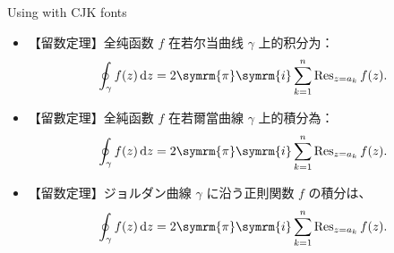\documentclass[aspectratio=169]{beamer}
\def\ii{\symrm{i}}
\def\pp{\symrm{\pi}}
\begin{document}
\begin{frame}{Using with CJK fonts}
\begin{itemize}
  \item {\fontzhhans 【留数定理】全纯函数 $f$ 在若尔当曲线 $\gamma$ 上的积分为：}
    \[
      \oint_\gamma f(z) \dd{z}
      = 2\pp\ii \sum_{k=1}^n \Res_{z=a_k} f(z).
    \]
  \item {\fontzhhant 【留數定理】全純函數 $f$ 在若爾當曲線 $\gamma$ 上的積分為：}
    \[
      \oint_\gamma f(z) \dd{z}
      = 2\pp\ii \sum_{k=1}^n \Res_{z=a_k} f(z).
    \]
  \item {\fontja 【留数定理】ジョルダン曲線 $\gamma$ に沿う正則関数 $f$ の積分は、}
    \[
      \oint_\gamma f(z) \dd{z}
      = 2\pp\ii \sum_{k=1}^n \Res_{z=a_k} f(z).
    \]
\end{itemize}
\end{frame}
\end{document}
